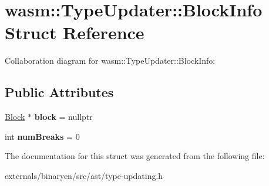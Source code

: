 \hypertarget{structwasm_1_1_type_updater_1_1_block_info}{}\section{wasm\+:\+:Type\+Updater\+:\+:Block\+Info Struct Reference}
\label{structwasm_1_1_type_updater_1_1_block_info}


Collaboration diagram for wasm\+:\+:Type\+Updater\+:\+:Block\+Info\+:
\subsection*{Public Attributes}
\begin{DoxyCompactItemize}
\item 
\mbox{\label{structwasm_1_1_type_updater_1_1_block_info_a60fff5e0674d5a456a14df33bb0f4873}} 
\mbox{\hyperlink{classwasm_1_1_block}{Block}} $\ast$ {\bfseries block} = nullptr
\item 
\mbox{\label{structwasm_1_1_type_updater_1_1_block_info_a4124f12b9f01291efcda1ddd6baf273c}} 
int {\bfseries num\+Breaks} = 0
\end{DoxyCompactItemize}


The documentation for this struct was generated from the following file\+:\begin{DoxyCompactItemize}
\item 
externals/binaryen/src/ast/type-\/updating.\+h\end{DoxyCompactItemize}
